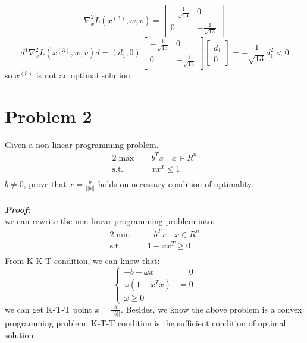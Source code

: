 \documentclass[paper=a4, fontsize=11pt]{scrartcl} %
\numberwithin{equation}{section} %
\numberwithin{figure}{section} %
\numberwithin{table}{section} %
\begin{document}
\begin{equation}\nonumber
\nabla^2_xL(x^{(3)},w,v) = \begin{bmatrix}-\frac{1}{\sqrt{13}}& 0\\0 & -\frac{1}{\sqrt{13}}\end{bmatrix}
\end{equation}
\begin{equation}\nonumber
d^T\nabla^2_xL(x^{(3)},w,v)d =(d_1,0)\begin{bmatrix}-\frac{1}{\sqrt{13}}& 0\\0 & -\frac{1}{\sqrt{13}}\end{bmatrix}
\begin{bmatrix}d_1\\0\end{bmatrix}=-\frac{1}{\sqrt{13}}d^2_1 <0
\end{equation}
so $x^{(3)}$ is not an optimal solution.
\section{Problem 2}
Given a non-linear programming problem.
\begin{alignat}{2}          \nonumber
\max\quad & b^Tx \quad  x\in R^n \\    \nonumber
\mbox{s.t.}\quad            \nonumber
& xx^T \leq 1\\         \nonumber
\end{alignat}
$b \neq 0$, prove that $\overline{x} = \frac{b}{||b||}$ holds on necessary condition of optimality.\\
\\
\emph{\textbf{Proof:}}\\
we can rewrite the non-linear programming problem into:
\begin{alignat}{2}          \nonumber
\min\quad & -b^Tx \quad  x\in R^n \\    \nonumber
\mbox{s.t.}\quad            \nonumber
& 1-xx^T\geq 0\\         \nonumber
\end{alignat}
From K-K-T condition, we can know that:
\begin{equation} \nonumber
\left\{
\begin{aligned}
-b+\omega x &= 0\\
\omega(1-x^Tx) &= 0\\
\omega \geq 0
\end{aligned}
\right.
\end{equation}
we can get K-T-T point $x=\frac{b}{||b||}$. Besides, we know the above problem is a convex programming problem, K-T-T condition is the sufficient condition of optimal solution.
\end{document}
